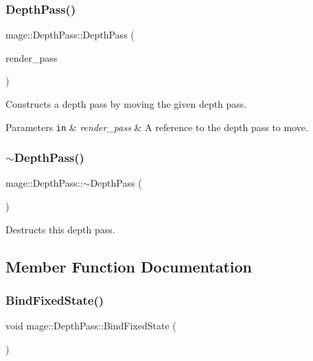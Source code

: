 \subsubsection{\texorpdfstring{Depth\+Pass()}{DepthPass()}\hspace{0.1cm}{\footnotesize\ttfamily [3/3]}}
{\footnotesize\ttfamily mage\+::\+Depth\+Pass\+::\+Depth\+Pass (\begin{DoxyParamCaption}\item[{\hyperlink{classmage_1_1_depth_pass}{Depth\+Pass} \&\&}]{render\+\_\+pass }\end{DoxyParamCaption})\hspace{0.3cm}{\ttfamily [default]}}

Constructs a depth pass by moving the given depth pass.


\begin{DoxyParams}[1]{Parameters}
\mbox{\tt in}  & {\em render\+\_\+pass} & A reference to the depth pass to move. \\
\hline
\end{DoxyParams}
\hypertarget{classmage_1_1_depth_pass_adc89d5da94b42294316d4ad1dfa09eb4}{}\label{classmage_1_1_depth_pass_adc89d5da94b42294316d4ad1dfa09eb4} 
\subsubsection{\texorpdfstring{$\sim$\+Depth\+Pass()}{~DepthPass()}}
{\footnotesize\ttfamily mage\+::\+Depth\+Pass\+::$\sim$\+Depth\+Pass (\begin{DoxyParamCaption}{ }\end{DoxyParamCaption})\hspace{0.3cm}{\ttfamily [default]}}

Destructs this depth pass. 

\subsection{Member Function Documentation}
\hypertarget{classmage_1_1_depth_pass_ae456ab7e6818e86ab2c09338652c9be0}{}\label{classmage_1_1_depth_pass_ae456ab7e6818e86ab2c09338652c9be0} 
\subsubsection{\texorpdfstring{Bind\+Fixed\+State()}{BindFixedState()}}
{\footnotesize\ttfamily void mage\+::\+Depth\+Pass\+::\+Bind\+Fixed\+State (\begin{DoxyParamCaption}{ }\end{DoxyParamCaption})}

